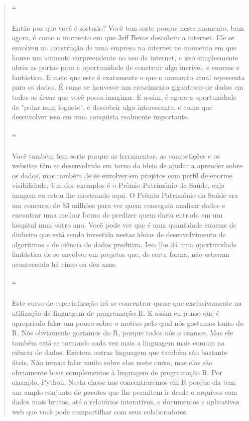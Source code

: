 \begin{quotation}
\begin{small}
\paragraph{``}
Então por que você é sortudo? Você tem sorte porque neste momento, bem agora,  é como o momento em que Jeff Bezos descobriu a internet. Ele se envolveu na construção de uma empresa na internet  no momento em que houve um aumento surpreendente no uso da internet,  e isso simplesmente abriu as portas para a oportunidade de construir algo incrível, e enorme e fantástico. E meio que este é exatamente o que o momento atual representa para os dados. É como se houvesse um crescimento gigantesco de dados em todas as áreas que você possa imaginar. E assim, é agora a oportunidade de "pular num foguete", e descobrir algo interessante,  e como que desenvolver isso em uma conquista realmente importante.

\paragraph{``}
Você também tem sorte porque as ferramentas, as competições e os websites têm se desenvolvido em torno da ideia de ajudar a aprender sobre os dados, mas também de se envolver em projetos com perfil de enorme visibilidade. Um dos exemplos é o Prêmio Patrimônio da Saúde, cuja imagem eu estou lhe mostrando aqui. O Prêmio Patrimônio da Saúde era um concurso de \$3 milhões para ver quem conseguia analisar dados e encontrar uma melhor forma de predizer  quem daria entrada em um hospital num outro ano. Você pode ver que é uma quantidade enorme de dinheiro que está sendo investida nestas ideias de desenvolvimento de algoritmos e de ciência de dados preditiva. Isso lhe dá uma oportunidade fantástica de se envolver em projetos que, de certa forma, não estavam acontecendo há cinco ou dez anos.

\paragraph{``}
Este curso de especialização irá se concentrar quase que exclusivamente na utilização da linguagem de programação R. E assim eu penso que é apropriado falar um pouco sobre o motivo pelo qual nós gostamos tanto do R. Nós obviamente gostamos do R, porque todos nós o usamos. Mas ele também está se tornando cada vez mais a linguagem mais comum na ciência de dados. Existem outras linguagem que também são bastante úteis. Não iremos falar muito sobre elas neste curso, mas elas são obviamente bons complementos à linguagem de programação R.  Por exemplo, Python. Nesta classe nos concentraremos em R porque ela tem um amplo conjunto de pacotes que lhe permitem ir desde o arquivos com dados mais brutos, até a relatórios interativos, e documentos e aplicativos web que você pode compartilhar com seus colaboradores.


\end{small}
\end{quotation}
